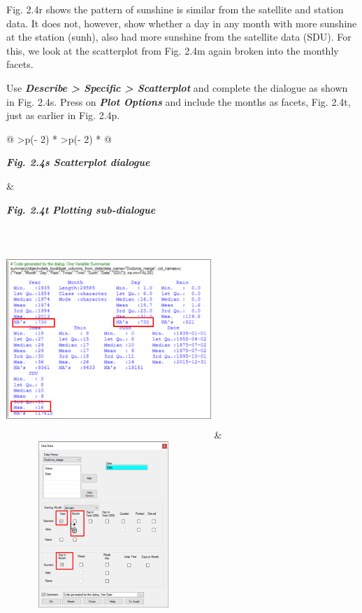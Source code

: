 \documentclass[
  letterpaper,
  DIV=11,
  numbers=noendperiod]{scrreprt}
\begin{document}
Fig. 2.4r shows the pattern of sunshine is similar from the satellite
and station data. It does not, however, show whether a day in any month
with more sunshine at the station (sunh), also had more sunshine from
the satellite data (SDU). For this, we look at the scatterplot from Fig.
2.4m again broken into the monthly facets.

Use \textbf{\emph{Describe \textgreater{} Specific \textgreater{}
Scatterplot}} and complete the dialogue as shown in Fig. 2.4s. Press on
\textbf{\emph{Plot Options}} and include the months as facets, Fig.
2.4t, just as earlier in Fig. 2.4p.

\begin{longtable}[]{@{}
  >{\centering\arraybackslash}p{(\columnwidth - 2\tabcolsep) * }
  >{\centering\arraybackslash}p{(\columnwidth - 2\tabcolsep) * }@{}}
\toprule\noalign{}
\begin{minipage}[b]{\linewidth}\centering
\textbf{\emph{Fig. 2.4s Scatterplot dialogue}}
\end{minipage} & \begin{minipage}[b]{\linewidth}\centering
\textbf{\emph{Fig. 2.4t Plotting sub-dialogue}}
\end{minipage} \\
\midrule\noalign{}
\endhead
\bottomrule\noalign{}
\endlastfoot
\includegraphics[width=3.05in,height=2.945in]{figures/Fig2.4g.png} &
\includegraphics[width=2.893in,height=2.466in]{figures/Fig2.4h.png} \\
\end{longtable}
\end{document}
